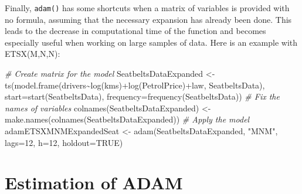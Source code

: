 \documentclass[
]{book}
\newenvironment{Shaded}{\begin{snugshade}}{\end{snugshade}}
\newcommand{\AttributeTok}[1]{\textcolor[rgb]{0.77,0.63,0.00}{#1}}
\newcommand{\CommentTok}[1]{\textcolor[rgb]{0.56,0.35,0.01}{\textit{#1}}}
\newcommand{\ConstantTok}[1]{\textcolor[rgb]{0.00,0.00,0.00}{#1}}
\newcommand{\DecValTok}[1]{\textcolor[rgb]{0.00,0.00,0.81}{#1}}
\newcommand{\FunctionTok}[1]{\textcolor[rgb]{0.00,0.00,0.00}{#1}}
\newcommand{\NormalTok}[1]{#1}
\newcommand{\OtherTok}[1]{\textcolor[rgb]{0.56,0.35,0.01}{#1}}
\newcommand{\SpecialCharTok}[1]{\textcolor[rgb]{0.00,0.00,0.00}{#1}}
\newcommand{\StringTok}[1]{\textcolor[rgb]{0.31,0.60,0.02}{#1}}
\theoremstyle{definition}
\theoremstyle{definition}
\theoremstyle{definition}
\theoremstyle{definition}
\theoremstyle{remark}
\begin{document}
Finally, \texttt{adam()} has some shortcuts when a matrix of variables is provided with no formula, assuming that the necessary expansion has already been done. This leads to the decrease in computational time of the function and becomes especially useful when working on large samples of data. Here is an example with ETSX(M,N,N):

\begin{Shaded}
\begin{Highlighting}[]
\CommentTok{\# Create matrix for the model}
\NormalTok{SeatbeltsDataExpanded }\OtherTok{\textless{}{-}}
  \FunctionTok{ts}\NormalTok{(}\FunctionTok{model.frame}\NormalTok{(drivers}\SpecialCharTok{\textasciitilde{}}\FunctionTok{log}\NormalTok{(kms)}\SpecialCharTok{+}\FunctionTok{log}\NormalTok{(PetrolPrice)}\SpecialCharTok{+}\NormalTok{law,}
\NormalTok{                 SeatbeltsData),}
     \AttributeTok{start=}\FunctionTok{start}\NormalTok{(SeatbeltsData), }\AttributeTok{frequency=}\FunctionTok{frequency}\NormalTok{(SeatbeltsData))}
\CommentTok{\# Fix the names of variables}
\FunctionTok{colnames}\NormalTok{(SeatbeltsDataExpanded) }\OtherTok{\textless{}{-}}
  \FunctionTok{make.names}\NormalTok{(}\FunctionTok{colnames}\NormalTok{(SeatbeltsDataExpanded))}
\CommentTok{\# Apply the model}
\NormalTok{adamETSXMNMExpandedSeat }\OtherTok{\textless{}{-}} \FunctionTok{adam}\NormalTok{(SeatbeltsDataExpanded, }\StringTok{"MNM"}\NormalTok{,}
                                \AttributeTok{lags=}\DecValTok{12}\NormalTok{, }\AttributeTok{h=}\DecValTok{12}\NormalTok{, }\AttributeTok{holdout=}\ConstantTok{TRUE}\NormalTok{)}
\end{Highlighting}
\end{Shaded}

\hypertarget{ADAMETSEstimation}{%
\chapter{Estimation of ADAM}\label{ADAMETSEstimation}}
\end{document}
